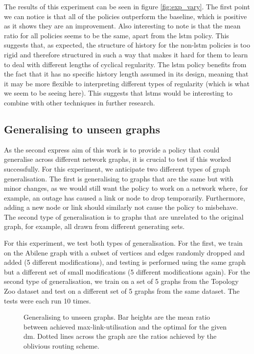 The results of this experiment can be seen in figure \ref{fig:exp_vary}. The first point we can notice is that all of the policies outperform the baseline, which is positive as it shows they are an improvement. Also interesting to note is that the mean ratio for all policies seems to be the same, apart from the \ac{lstm} policy. This suggests that, as expected, the structure of history for the non-\ac{lstm} policies is too rigid and therefore structured in such a way that makes it hard for them to learn to deal with different lengths of cyclical regularity. The \ac{lstm} policy benefits from the fact that it has no specific history length assumed in its design, meaning that it may be more flexible to interpreting different types of regularity (which is what we seem to be seeing here). This suggests that \acp{lstm} would be interesting to combine with other techniques in further research.

\subsection{Generalising to unseen graphs}
As the second express aim of this work is to provide a policy that could generalise across different network graphs, it is crucial to test if this worked successfully. For this experiment, we anticipate two different types of graph generalisation. The first is generalising to graphs that are the same but with minor changes, as we would still want the policy to work on a network where, for example, an outage has caused a link or node to drop temporarily. Furthermore, adding a new node or link should similarly not cause the policy to misbehave. The second type of generalisation is to graphs that are unrelated to the original graph, for example, all drawn from different generating sets.

For this experiment, we test both types of generalisation. For the first, we train on the Abilene graph with a subset of vertices and edges randomly dropped and added (5 different modifications), and testing is performed using the same graph but a different set of small modifications (5 different modifications again). For the second type of generalisation, we train on a set of 5 graphs from the Topology Zoo dataset and test on a different set of 5 graphs from the same dataset. The tests were each run 10 times.

\begin{figure}
    \centering
    
    \caption{Generalising to unseen graphs. Bar heights are the mean ratio between achieved max-link-utilisation and the optimal for the given \ac{dm}. Dotted lines across the graph are the ratios achieved by the oblivious routing scheme.}
    \label{fig:exp_graphs}
\end{figure}

